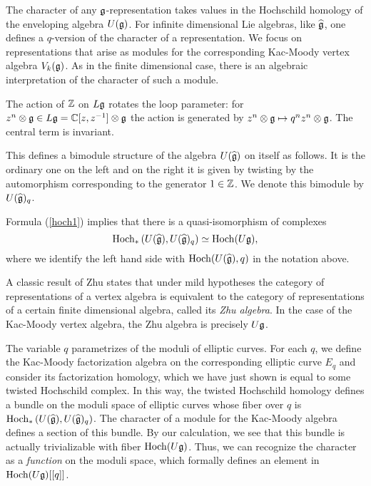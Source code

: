 The character of any $\mathfrak g$-representation takes values in the Hochschild homology of the enveloping algebra $U(\mathfrak g)$. 
For infinite dimensional Lie algebras, like $\widehat{\mathfrak g}$, one defines a $q$-version of the character of a representation.
We focus on representations that arise as modules for the corresponding Kac-Moody vertex algebra $V_{k}(\mathfrak g)$. 
As in the finite dimensional case, there is an algebraic interpretation of the character of such a module. 

The action of $\mathbb Z$ on $L\mathfrak g$ rotates the loop parameter: for $z^n \otimes \mathfrak g \in L \mathfrak g = \mathbb C[z,z^{-1}] \otimes \mathfrak g$ the action is generated by $z^n \otimes \mathfrak g \mapsto q^n z^n \otimes \mathfrak g$. 
The central term is invariant. 

This defines a bimodule structure of the algebra $U(\widehat{\mathfrak g})$ on itself as follows.
It is the ordinary one on the left and on the right it is given by twisting by the automorphism corresponding to the generator $1 \in \mathbb Z$. 
We denote this bimodule by $U(\widehat{\mathfrak g})_{q}$.

Formula (\ref{hoch1}) implies that there is a quasi-isomorphism of complexes
\[
{\rm Hoch}_*\left(U(\widehat{\mathfrak g}), U(\widehat{\mathfrak g})_q \right) \simeq {\rm Hoch}(U \mathfrak g) ,
\]
where we identify the left hand side with ${\rm Hoch}(U(\widehat{\mathfrak g}), q)$ in the notation above. 

A classic result of Zhu \cite{Zhu} states that under mild hypotheses the category of representations of a vertex algebra is equivalent to the category of representations of a certain finite dimensional algebra, called its {\em Zhu algebra}. 
In the case of the Kac-Moody vertex algebra, the Zhu algebra is precisely $U\mathfrak g$. 

The variable $q$ parametrizes of the moduli of elliptic curves.
For each $q$, we define the Kac-Moody factorization algebra on the corresponding elliptic curve $E_q$ and consider its factorization homology, which we have just shown is equal to some twisted Hochschild complex.
In this way, the twisted Hochschild homology defines a bundle on the moduli space of elliptic curves whose fiber over $q$ is ${\rm Hoch}_*\left(U(\widehat{\mathfrak g}), U(\widehat{\mathfrak g})_q \right)$. 
The character of a module for the Kac-Moody algebra defines a section of this bundle. 
By our calculation, we see that this bundle is actually trivializable with fiber ${\rm Hoch}(U \mathfrak g)$.
Thus, we can recognize the character as a {\em function} on the moduli space, which formally defines an element in ${\rm Hoch}(U \mathfrak g) [[q]]$. 

